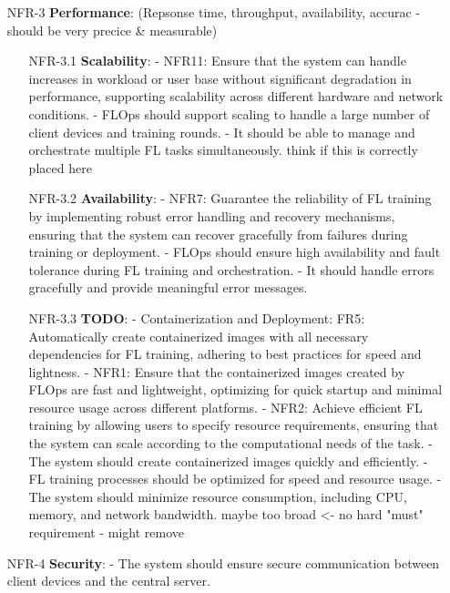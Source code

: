 \begin{itemize}
\begin{itemize}
        \end{itemize}
    \item [NFR-3] {\textbf{Performance}}: (Repsonse time, throughput, availability, accurac - should be very precice \& measurable)
        \begin{itemize}
        \item [NFR-3.1] {\textbf{Scalability}}:
            - NFR11: Ensure that the system can handle increases in workload or user base without significant degradation in performance, supporting scalability across different hardware and network conditions.
            - FLOps should support scaling to handle a large number of client devices and training rounds.
            - It should be able to manage and orchestrate multiple FL tasks simultaneously. think if this is correctly placed here
        \item [NFR-3.2] {\textbf{Availability}}: %
            - NFR7: Guarantee the reliability of FL training by implementing robust error handling and recovery mechanisms, ensuring that the system can recover gracefully from failures during training or deployment.
            - FLOps should ensure high availability and fault tolerance during FL training and orchestration.
            - It should handle errors gracefully and provide meaningful error messages.
        \item [NFR-3.3] {\textbf{TODO}}: %
            - Containerization and Deployment:
                FR5: Automatically create containerized images with all necessary dependencies for FL training, adhering to best practices for speed and lightness.
            - NFR1: Ensure that the containerized images created by FLOps are fast and lightweight, optimizing for quick startup and minimal resource usage across different platforms.
            - NFR2: Achieve efficient FL training by allowing users to specify resource requirements, ensuring that the system can scale according to the computational needs of the task.
            - The system should create containerized images quickly and efficiently.
            - FL training processes should be optimized for speed and resource usage.
            - The system should minimize resource consumption, including CPU, memory, and network bandwidth. maybe too broad <- no hard "must" requirement - might remove
        \end{itemize}
    \item [NFR-4] {\textbf{Security}}:
        - The system should ensure secure communication between client devices and the central server.

\end{itemize}
